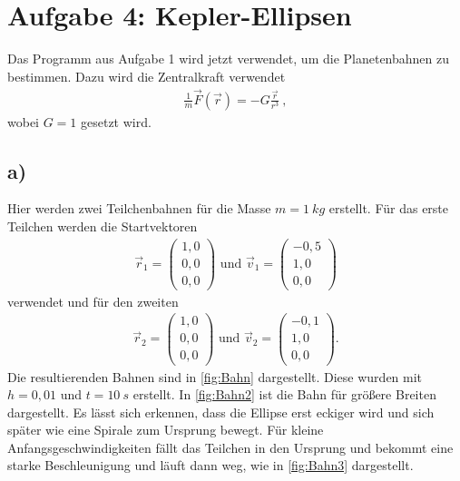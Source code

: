 
\section*{Aufgabe 4: Kepler-Ellipsen}
Das Programm aus Aufgabe 1 wird jetzt verwendet, um die Planetenbahnen zu bestimmen.
Dazu wird die Zentralkraft verwendet
\begin{align}
	\frac{1}{m}\vec{F}(\vec{r})=-G\frac{\vec{r}}{r^3}~,
\end{align}
wobei $G=1$ gesetzt wird.
\subsection*{a)}
Hier werden zwei Teilchenbahnen für die Masse $m=\SI{1}{kg}$ erstellt.
Für das erste Teilchen werden die Startvektoren 
\begin{align}
	\vec{r}_1=
	\begin{pmatrix}
		1,0\\0,0\\0,0
	\end{pmatrix}\text{ und }
	\vec{v}_1=
	\begin{pmatrix}
		-0,5\\1,0\\0,0
	\end{pmatrix}
\end{align}
verwendet und für den zweiten
\begin{align}
	\vec{r}_2=
	\begin{pmatrix}
		1,0\\0,0\\0,0
	\end{pmatrix}\text{ und }
	\vec{v}_2=
	\begin{pmatrix}
		-0,1\\1,0\\0,0
	\end{pmatrix}.
\end{align}
Die resultierenden Bahnen sind in \cref{fig:Bahn} dargestellt.
Diese wurden mit $h=0,01$ und $t=\SI{10}{s}$ erstellt.
In \cref{fig:Bahn2} ist die Bahn für größere Breiten dargestellt.
Es lässt sich erkennen, dass die Ellipse erst eckiger wird und sich später wie eine Spirale zum Ursprung bewegt.
Für kleine Anfangsgeschwindigkeiten fällt das Teilchen in den Ursprung und bekommt eine starke Beschleunigung und läuft dann weg, wie in \cref{fig:Bahn3} dargestellt.\\

